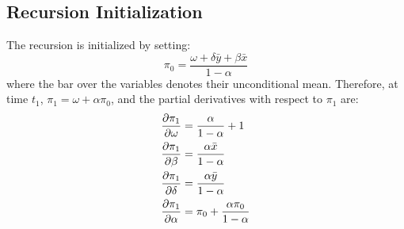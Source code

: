 \subsection{Recursion Initialization}
The recursion is initialized by setting:
\begin{equation}\label{eq:rcs}
{\pi _0} = \frac{{\omega  + \delta \bar y + \beta \bar x}}{{1 - \alpha }}
\end{equation}
where the bar over the variables denotes their unconditional mean. Therefore, at time $t_1$, ${\pi _1} = \omega  + \alpha {\pi _0}$, and the partial derivatives with respect to $\pi_1$ are:
\begin{equation}\label{eq:rcsderiv}
\begin{gathered}
  \frac{{\partial {\pi _1}}}
{{\partial \omega }} = \frac{\alpha }
{{1 - \alpha }} + 1 \hfill \\
  \frac{{\partial {\pi _1}}}
{{\partial \beta }} = \frac{{\alpha \bar x}}
{{1 - \alpha }} \hfill \\
  \frac{{\partial {\pi _1}}}
{{\partial \delta }} = \frac{{\alpha \bar y}}
{{1 - \alpha }} \hfill \\
  \frac{{\partial {\pi _1}}}
{{\partial \alpha }} = {\pi _0} + \frac{{\alpha {\pi _0}}}
{{1 - \alpha }} \hfill \\
\end{gathered}
\end{equation}
